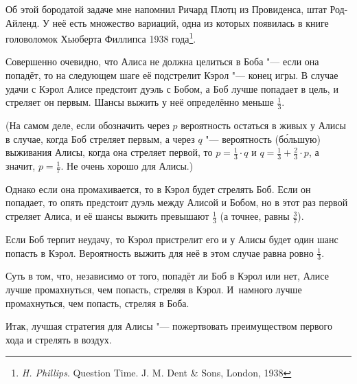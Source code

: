 \documentclass[twoside]{book}
\begin{document}
Об этой бородатой задаче мне напомнил Ричард Плотц из Провиденса, штат Род-Айленд.
У неё есть множество вариаций, одна из которых появилась в книге головоломок Хьюберта Филлипса 1938 года\footnote{\emph{H. Phillips}. {Question Time}. J. M. Dent \& Sons, London, 1938}.

\medskip

Совершенно очевидно, что Алиса не должна целиться в Боба "--- если она попадёт, то на следующем шаге её подстрелит Кэрол "--- конец игры.
В случае удачи с Кэрол Алисе предстоит дуэль с Бобом, а Боб лучше попадает в цель, и стреляет он первым.
Шансы выжить у неё определённо меньше $\tfrac13$.

(На самом деле, если обозначить через $p$ вероятность остаться в живых у Алисы в случае, когда Боб стреляет первым, а через $q$ "--- вероятность (б\'{о}льшую) выживания Алисы, когда она стреляет первой, то $p=\tfrac13\cdot q$ и $q=\tfrac13+\tfrac23\cdot p$, а значит, $p=\tfrac17$.
Не очень хорошо для Алисы.)

Однако если она промахивается, то в Кэрол будет стрелять Боб.
Если он попадает, то опять предстоит дуэль между Алисой и Бобом, но в этот раз первой стреляет Алиса, и её шансы выжить превышают $\tfrac13$ (а точнее, равны $\tfrac37$).

Если Боб терпит неудачу, то Кэрол пристрелит его и у Алисы будет один шанс попасть в Кэрол.
Вероятность выжить для неё в этом случае равна ровно $\tfrac13$.

Суть в том, что, независимо от того, попадёт ли Боб в Кэрол или нет, Алисе лучше промахнуться, чем попасть, стреляя в Кэрол.
И~намного лучше промахнуться, чем попасть, стреляя в Боба.

Итак, лучшая стратегия для Алисы "--- пожертвовать преимуществом первого хода и стрелять в воздух.

\medskip
\end{document}
